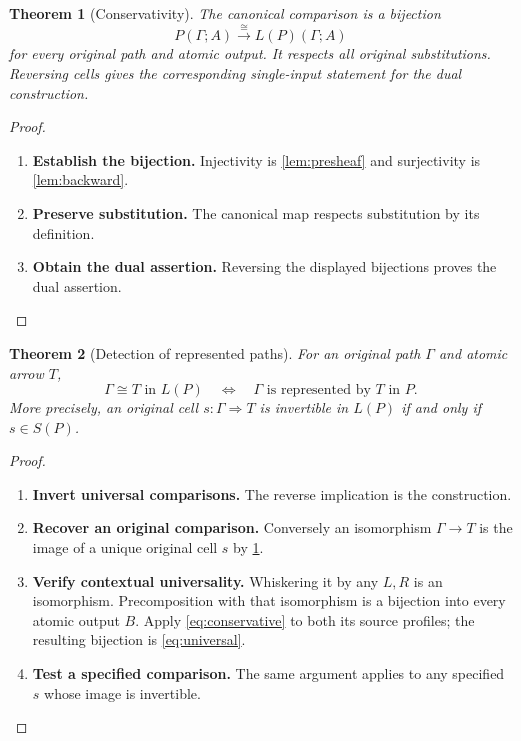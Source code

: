 \documentclass[11pt,reqno]{amsart}
\theoremstyle{plain}
\newtheorem{theorem}{Theorem}[section]
\theoremstyle{definition}
\theoremstyle{remark}
\numberwithin{equation}{section}
\newcommand{\cell}{\mathrel{\Longrightarrow}}
\begin{document}
\begin{theorem}[Conservativity]\label{thm:conservative}
The canonical comparison is a bijection
\begin{equation}\label{eq:conservative}
 P(\Gamma;A)\xrightarrow{\ \cong\ }L(P)(\Gamma;A)
\end{equation}
for every original path and atomic output. It respects all original
substitutions. Reversing cells gives the corresponding single-input
statement for the dual construction.
\end{theorem}
\begin{proof}\leavevmode
\begin{enumerate}
\item \textbf{Establish the bijection.} Injectivity is \cref{lem:presheaf} and surjectivity is
\cref{lem:backward}.

\item \textbf{Preserve substitution.} The canonical map respects substitution by its
definition.

\item \textbf{Obtain the dual assertion.} Reversing the displayed bijections proves the dual assertion.\qedhere
\end{enumerate}
\end{proof}

\begin{theorem}[Detection of represented paths]\label{thm:detection}
For an original path $\Gamma$ and atomic arrow $T$,
\[
 \Gamma\cong T\text{ in }L(P)
 \quad\Longleftrightarrow\quad
 \Gamma\text{ is represented by }T\text{ in }P.
\]
More precisely, an original cell $s:\Gamma\cell T$ is invertible in
$L(P)$ if and only if $s\in S(P)$.
\end{theorem}
\begin{proof}\leavevmode
\begin{enumerate}
\item \textbf{Invert universal comparisons.} The reverse implication is the construction.

\item \textbf{Recover an original comparison.} Conversely an isomorphism
$\Gamma\to T$ is the image of a unique original cell $s$ by
\cref{thm:conservative}.

\item \textbf{Verify contextual universality.} Whiskering it by any $L,R$ is an isomorphism.
Precomposition with that isomorphism is a bijection into every atomic
output $B$. Apply \cref{eq:conservative} to both its source profiles;
the resulting bijection is \cref{eq:universal}.

\item \textbf{Test a specified comparison.} The same argument applies
to any specified $s$ whose image is invertible.\qedhere
\end{enumerate}
\end{proof}
\end{document}

